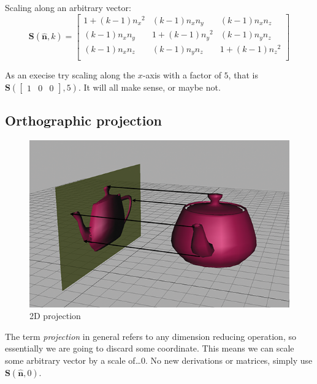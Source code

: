 \documentclass[11pt]{article}
\begin{document}
Scaling along an arbitrary vector: \\
$$
\mathbf{S}(\hat{\mathbf{n}},k) = \begin{bmatrix}
{1 + \left( k - 1 \right){n_{x}}^{2}} & {\left( k - 1 \right)n_{x}n_{y}} & {\left( k - 1 \right)n_{x}n_{z}} \\
{\left( k - 1 \right)n_{x}n_{y}} & {1 + \left( k - 1 \right){n_{y}}^{2}} & {\left( k - 1 \right)n_{y}n_{z}} \\
{\left( k - 1 \right)n_{x}n_{z}} & {\left( k - 1 \right)n_{y}n_{z}} & {1 + \left( k - 1 \right){n_{z}}^{2}} \\
\end{bmatrix}
$$

As an execise try scaling along the $x$-axis with a factor of $5$, that is $\mathbf{S}(
\begin{bmatrix}
1 & 0 & 0
\end{bmatrix},5)$. It will all make sense, or maybe not.

\subsection{Orthographic projection}

\begin{figure}[H]
\centering
    \includegraphics{05_projection}
\caption{2D projection}
\label{fig:2d-projection}
\end{figure}

The term \textit{projection} in general refers to any dimension reducing operation, so essentially we are going to discard some coordinate. This means we can scale some arbitrary vector by a scale of\dots $0$. No new derivations or matrices, simply use $\mathbf{S}(\hat{\mathbf{n}},0)$.
\end{document}

